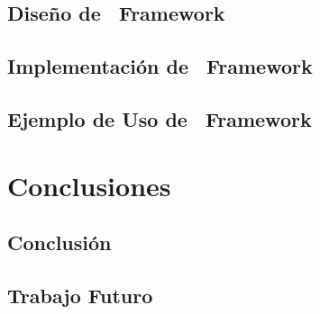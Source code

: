 \documentclass{report}
\begin{document}
        \chapter{Diseño de \nombreFramework \ Framework}
        	\label{cap:diseno_framework}
        	
            
            
            
            
            
        \chapter{Implementación de \nombreFramework \ Framework}
            
       	\chapter{Ejemplo de Uso de \nombreFramework \ Framework}
        	

    \part{Conclusiones}
        \chapter{Conclusión}
            
        \chapter{Trabajo Futuro}
            
    
	
\end{document}
